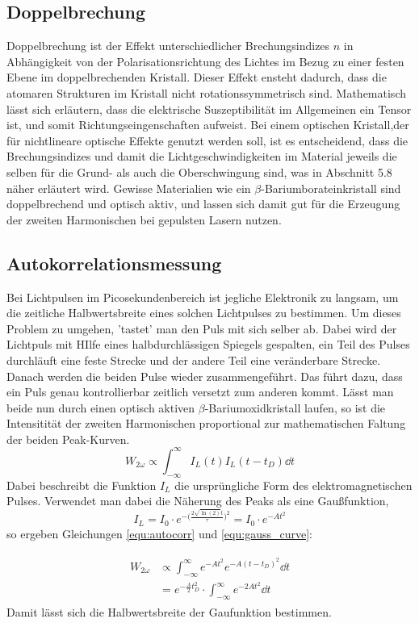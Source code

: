 \subsection{Doppelbrechung}
Doppelbrechung ist der Effekt unterschiedlicher Brechungsindizes $n$ in Abhängigkeit von
der Polarisationsrichtung des Lichtes im Bezug zu einer festen Ebene im doppelbrechenden Kristall. Dieser Effekt ensteht dadurch, dass die atomaren Strukturen im Kristall nicht rotationssymmetrisch sind. Mathematisch
lässt sich erläutern, dass die elektrische Suszeptibilität im Allgemeinen ein Tensor ist, und somit Richtungseingenschaften aufweist. 
Bei einem optischen Kristall,der für nichtlineare optische Effekte genutzt werden soll, ist es entscheidend, dass die Brechungsindizes und damit die Lichtgeschwindigkeiten
im Material jeweils die selben für die Grund- als auch die Oberschwingung sind, was in Abschnitt 5.8 näher erläutert wird.
Gewisse Materialien wie ein $\beta$-Bariumborateinkristall sind doppelbrechend und optisch aktiv,
und lassen sich damit gut für die Erzeugung der zweiten Harmonischen bei gepulsten Lasern nutzen.

\subsection{Autokorrelationsmessung}
Bei Lichtpulsen im Picosekundenbereich ist jegliche Elektronik zu langsam, um die zeitliche Halbwertsbreite
eines solchen Lichtpulses zu bestimmen. Um dieses Problem zu umgehen, 'tastet' man den Puls mit sich selber ab.
Dabei wird der Lichtpuls mit HIlfe eines halbdurchlässigen Spiegels gespalten, ein Teil des Pulses durchläuft eine feste Strecke und der andere Teil eine veränderbare Strecke. Danach werden die beiden Pulse wieder zusammengeführt.
Das führt dazu, dass ein Puls genau kontrollierbar zeitlich versetzt zum anderen kommt.
Lässt man beide nun durch einen optisch aktiven $\beta$-Bariumoxidkristall laufen, so ist die Intensitität der zweiten Harmonischen proportional zur mathematischen Faltung der beiden Peak-Kurven.
\begin{equation}
  W_{2\omega} \propto \int_{-\infty}^{\infty}{I_L(t)I_L(t-t_D)\dd{t}}
  \label{equ:autocorr}
\end{equation}
Dabei beschreibt die Funktion $I_L$ die ursprüngliche Form des elektromagnetischen Pulses.
Verwendet man dabei die Näherung des Peaks als eine Gaußfunktion,
\begin{equation}
  I_L = I_0 \cdot e^{-\big(\frac{2\sqrt{\ln(2)}t}{\tau}\big)^2} = I_0 \cdot e^{-At^2}
  \label{equ:gauss_curve}
\end{equation}
so ergeben Gleichungen \ref{equ:autocorr} und \ref{equ:gauss_curve}:

\begin{align}
\begin{split}
  W_{2\omega} & \propto \int_{-\infty}^{\infty} e^{-At^2} e^{-A(t-t_D)^2} \dd{t} \\
& = e^{-\frac{A}{2} t_D^2} \cdot \int_{-\infty}^{\infty} e^{-2At^2} \dd{t}
\label{eq:Autokorr}
\end{split}
\end{align}
Damit lässt sich die Halbwertsbreite der Gaufunktion bestimmen.


